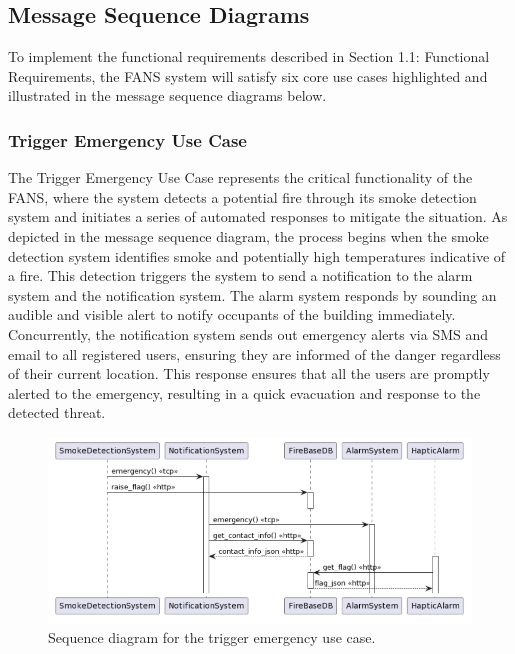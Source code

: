 \subsection{Message Sequence Diagrams}

To implement the functional requirements described in Section 1.1: Functional Requirements, the FANS system will
satisfy six core use cases highlighted and illustrated in the message sequence diagrams below.

\subsubsection{Trigger Emergency Use Case}

The Trigger Emergency Use Case represents the critical functionality of the FANS, where the system detects a potential
fire through its smoke detection system and initiates a series of automated responses to mitigate the situation. As
depicted in the message sequence diagram, the process begins when the smoke detection system identifies smoke and
potentially high temperatures indicative of a fire. This detection triggers the system to send a notification to the
alarm system and the notification system. The alarm system responds by sounding an audible and visible alert to notify
occupants of the building immediately. Concurrently, the notification system sends out emergency alerts via SMS and
email to all registered users, ensuring they are informed of the danger regardless of their current location. This
response ensures that all the users are promptly alerted to the emergency, resulting in a quick evacuation and response
to the detected threat.

\begin{figure}[H]
    \centering
    \includegraphics[width=\linewidth]{../assets/TriggerEmergencyUseCase.png}
    \caption{Sequence diagram for the trigger emergency use case.}
\end{figure}

